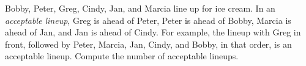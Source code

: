 Bobby, Peter, Greg, Cindy, Jan, and Marcia line up for ice cream. In an \emph{acceptable lineup}, Greg is ahead of Peter, Peter is ahead of Bobby, Marcia is ahead of Jan, and Jan is ahead of Cindy. For example, the lineup with Greg in front, followed by Peter, Marcia, Jan, Cindy, and Bobby, in that order, is an acceptable lineup. Compute the number of acceptable lineups.